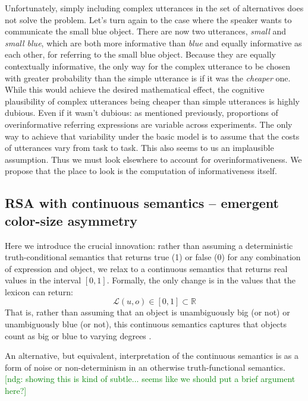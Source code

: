 \documentclass[11pt]{article}
\newcommand{\ndg}[1]{\textcolor{Green}{[ndg: #1]}}
\begin{document}
Unfortunately, simply including complex utterances in the set of alternatives does not solve the problem. Let's turn again to the case where the speaker wants to communicate the small blue object. There are now two  utterances, \emph{small} and \emph{small blue}, which are both more informative than \emph{blue} and equally informative as each other, for referring to the small blue object. Because they are equally contextually informative, the only way for the complex utterance to be chosen with greater probability than the simple utterance is if it was the \emph{cheaper} one. While this would achieve the desired mathematical effect, the cognitive plausibility of complex utterances being cheaper than simple utterances is highly dubious. Even if it wasn't dubious: as  mentioned previously,  proportions of overinformative referring expressions are variable across experiments. The only way to achieve that variability under the basic model is to assume that the costs of utterances vary from task to task. This also seems to us an implausible assumption. Thus we must look elsewhere to account for overinformativeness. We propose that the place to look is the computation of informativeness itself. 

\subsection{RSA with continuous semantics -- emergent color-size asymmetry}
\label{sec:modifiedmodel}

Here we introduce the crucial innovation: rather than assuming a deterministic truth-conditional semantics that returns true (1) or false (0) for any combination of expression and object, we relax to a continuous semantics that returns real values in the interval $[0,1]$. 
Formally, the only change is in the values that the lexicon can return:
\begin{equation}
\mathcal{L}(u,o) \in [0, 1] \subset \mathbb{R}
\end{equation}
That is, rather than assuming that an object is unambiguously big (or not) or unambiguously blue (or not), this continuous semantics captures that objects count as big or blue to  varying degrees \cite<similar to approaches in fuzzy logic and prototype theory,>{zadeh1965fuzzy, Rosch1973}. 

An alternative, but equivalent, interpretation of the continuous semantics is as a form of noise or non-determinism in an otherwise truth-functional semantics. \ndg{showing this is kind of subtle... seems like we should put a brief argument here?}
\end{document}
